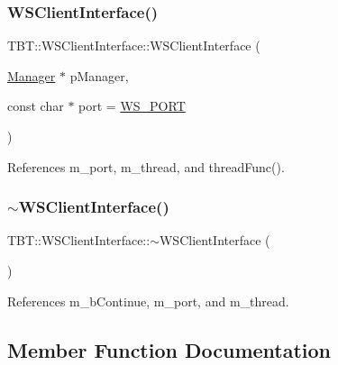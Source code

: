 \subsubsection{\texorpdfstring{W\+S\+Client\+Interface()}{WSClientInterface()}}
{\footnotesize\ttfamily T\+B\+T\+::\+W\+S\+Client\+Interface\+::\+W\+S\+Client\+Interface (\begin{DoxyParamCaption}\item[{\hyperlink{classTBT_1_1Manager}{Manager} $\ast$}]{p\+Manager,  }\item[{const char $\ast$}]{port = {\ttfamily \hyperlink{WSClientInterface_8h_afe65cb51ee32f3e2bb3bf811958d49f2_afe65cb51ee32f3e2bb3bf811958d49f2}{W\+S\+\_\+\+P\+O\+RT}} }\end{DoxyParamCaption})}



References m\+\_\+port, m\+\_\+thread, and thread\+Func().

\mbox{\label{classTBT_1_1WSClientInterface_a4b9ee6b21999c47c2cd3f58f8575297c_a4b9ee6b21999c47c2cd3f58f8575297c}} 
\subsubsection{\texorpdfstring{$\sim$\+W\+S\+Client\+Interface()}{~WSClientInterface()}}
{\footnotesize\ttfamily T\+B\+T\+::\+W\+S\+Client\+Interface\+::$\sim$\+W\+S\+Client\+Interface (\begin{DoxyParamCaption}{ }\end{DoxyParamCaption})\hspace{0.3cm}{\ttfamily [virtual]}}



References m\+\_\+b\+Continue, m\+\_\+port, and m\+\_\+thread.



\subsection{Member Function Documentation}
\mbox{\label{classTBT_1_1WSClientInterface_a2ad439e557711c57c8a978e3b6efcb62_a2ad439e557711c57c8a978e3b6efcb62}} 
